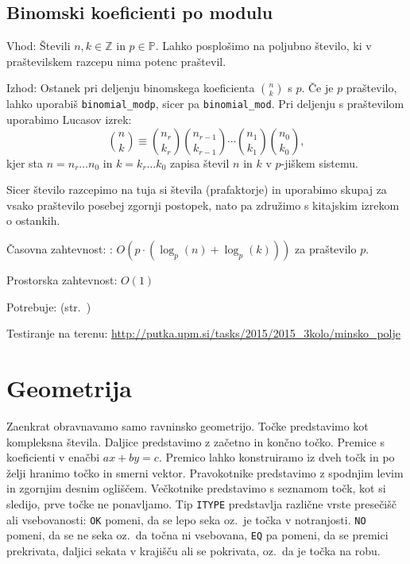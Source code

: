 \documentclass[a4paper,oneside,12pt]{article}
\def\Z{\mathbb{Z}}
\newenvironment{description*}%
{
\begin{description}
\setlength{\itemsep}{0pt}
\setlength{\parskip}{2pt}
}
{\end{description}}
\newcommand{\cpp}[1]{\cppsource{implementacija/#1}}
\begin{document}
\subsection{Binomski koeficienti po modulu}
\label{sec:binommod}
\begin{description*}
  \item[Vhod:] Števili $n, k \in \Z$ in $p \in \mathbb{P}$. Lahko posplošimo na
    poljubno število, ki v praštevilskem razcepu nima potenc praštevil.
  \item[Izhod:] Ostanek pri deljenju binomskega koeficienta $\binom{n}{k}$ s
    $p$. Če je $p$ praštevilo, lahko uporabiš \verb|binomial_modp|, sicer pa
    \verb|binomial_mod|. Pri deljenju s praštevilom uporabimo Lucasov izrek:
    \[ \binom{n}{k} \equiv
      \binom{n_r}{k_r}\binom{n_{r-1}}{k_{r-1}}\cdots\binom{n_1}{k_1}\binom{n_0}{k_0},
    \] kjer sta $n = n_r\ldots n_0$ in $k = k_r\ldots k_0$ zapisa števil $n$ in
    $k$ v $p$-jiškem sistemu.

    Sicer število razcepimo na tuja si števila
    (prafaktorje) in uporabimo skupaj za vsako praštevilo posebej zgornji
    postopek, nato pa združimo s kitajskim izrekom o ostankih.
  \item[Časovna zahtevnost:]: $O(p \cdot (\log_p(n) + \log_p(k)))$ za praštevilo $p$.
  \item[Prostorska zahtevnost:] $O(1)$
  \item[Potrebuje:] 
    (str.~\pageref{sec:ts:chinese})
  \item[Testiranje na terenu:]
    \url{http://putka.upm.si/tasks/2015/2015_3kolo/minsko_polje}
\end{description*}
\cpp{ts/binomial_mod.cpp}

\section{Geometrija}
\label{sec:geom}
Zaenkrat obravnavamo samo ravninsko geometrijo.
Točke predstavimo kot kompleksna števila. Daljice predstavimo z začetno in
končno točko. Premice s koeficienti v enačbi $ax + by = c$. Premico lahko
konstruiramo iz dveh točk in po želji hranimo točko in smerni vektor.
Pravokotnike predstavimo z spodnjim levim in zgornjim desnim ogliščem.
Večkotnike predstavimo s seznamom točk, kot si sledijo, prve točke ne
ponavljamo. Tip \texttt{ITYPE} predstavlja različne vrste presečišč ali
vsebovanosti: \texttt{OK} pomeni, da se lepo seka oz.\ je točka v notranjosti.
\texttt{NO} pomeni, da se ne seka oz.\ da točna ni vsebovana, \texttt{EQ} pa
pomeni, da se premici prekrivata, daljici sekata v krajišču ali se pokrivata,
oz.\ da je točka na robu.
\end{document}
